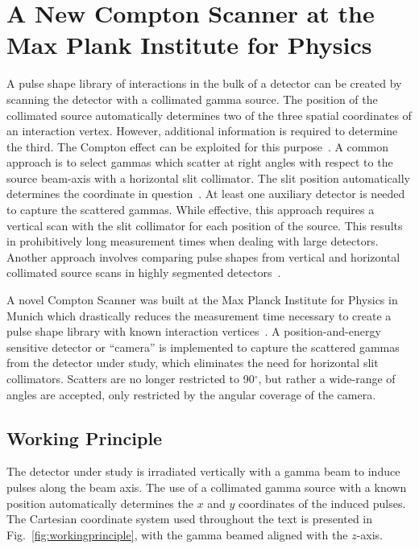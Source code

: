 \chapter{A New Compton Scanner at the Max Plank Institute for Physics} \label{chap:scanner}

A pulse shape library of interactions in the bulk of a detector can be created by scanning the detector with a collimated gamma source. The position of the collimated source automatically determines two of the three spatial coordinates of an interaction vertex. However, additional information is required to determine the third. The Compton effect can be exploited for this purpose~\cite{Petry1993,Vetter2000,Abt2008,Dimmock2009,Ha2013,vonSturm2017}. A common approach is to select gammas which scatter at right angles with respect to the source beam-axis with a horizontal slit collimator. The slit position automatically determines the coordinate in question~\cite{Vetter2000,Dimmock2009,Ha2013,vonSturm2017}. At least one auxiliary detector is needed to capture the scattered gammas. While effective, this approach requires a vertical scan with the slit collimator for each position of the source. This results in prohibitively long measurement times when dealing with large detectors. Another approach involves comparing pulse shapes from vertical and horizontal collimated source scans in highly segmented detectors~\cite{Crespi2008,DeCanditiis2020}.

A novel Compton Scanner was built at the Max Planck Institute for Physics in Munich which drastically reduces the measurement time necessary to create a pulse shape library with known interaction vertices~\cite{compton_scanner}. A position-and-energy sensitive detector or ``camera'' is implemented to capture the scattered gammas from the detector under study, which eliminates the need for horizontal slit collimators. Scatters are no longer restricted to 90$^{\circ}$, but rather a wide-range of angles are accepted, only restricted by the angular coverage of the camera.

\section{Working Principle}\label{sec:workingprinciple}

The detector under study is irradiated vertically with a gamma beam to induce pulses along the beam axis. The use of a collimated gamma source with a known position automatically determines the $x$ and $y$ coordinates of the induced pulses. The Cartesian coordinate system used throughout the text is presented in Fig.~\ref{fig:workingprinciple}, with the gamma beamed aligned with the $z$-axis. 

